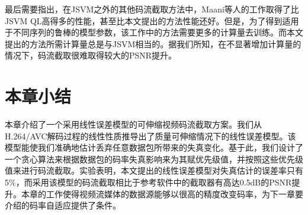 最后需要指出，在JSVM之外的其他码流截取方法中，Maani等人的工作\supercite{Maani2009}取得了比JSVM QL高得多的性能，甚至比本文提出的方法性能还好。但是，为了得到适用于不同序列的鲁棒的模型参数，该工作中的方法需要更多的计算量去训练。而本文提出的方法所需计算量总是与JSVM相当的。据我们所知，在不显著增加计算量的情况下，码流截取很难取得较大的PSNR提升。

\section{本章小结}

本章介绍了一个采用线性误差模型的可伸缩视频码流截取方案。我们从H.264/AVC解码过程的线性性质推导出了质量可伸缩情况下的线性误差模型。该模型能使我们准确地估计丢弃任意数据包所带来的失真变化。基于此，我们设计了一个贪心算法来根据数据包的码率失真影响来为其赋优先级值，并按照这些优先级值来进行码流截取。实验表明，本文提出的线性误差模型对失真估计的误差率只有5\%，而采用该模型的码流截取相比于参考软件中的截取器有高达0.5dB的PSNR提升。本章的工作使得视频流媒体的数据源能够以很高的精度改变码率，为下一章要介绍的码率自适应提供了条件。